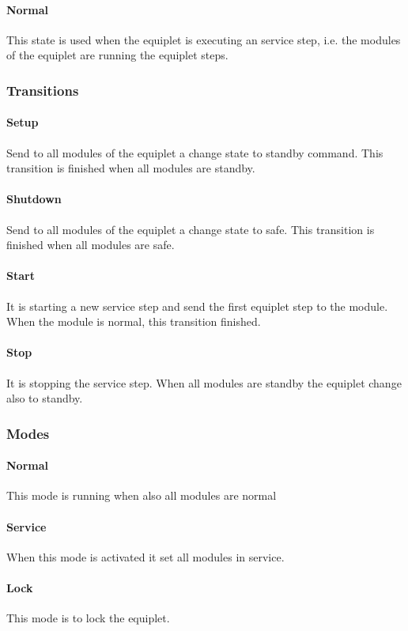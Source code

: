 \documentclass[12pt,a4paper]{report}
\begin{document}
\paragraph{Normal}This state is used when the equiplet is executing an service step, i.e. the modules of the equiplet are running the equiplet steps. 

\subsubsection{Transitions}
\paragraph{Setup}Send to all modules of the equiplet a change state to standby command. This transition is finished when all modules are standby.
\paragraph{Shutdown}Send to all modules of the equiplet a change state to safe. This transition is finished when all modules are safe.
\paragraph{Start}It is starting a new service step and send the first equiplet step to the module. When the module is normal, this transition finished.
\paragraph{Stop}It is stopping the service step. When all modules are standby the equiplet change also to standby.

\subsubsection{Modes}
\paragraph{Normal}This mode is running when also all modules are normal
\paragraph{Service}When this mode is activated it set all modules in service.
\paragraph{Lock}This mode is to lock the equiplet.
\end{document}
